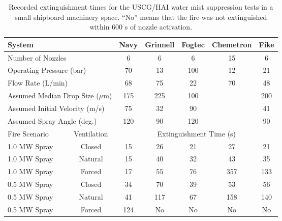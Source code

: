 \begin{table}[h!]
\caption[USCG/HAI water mist suppression extinguishment times.]{Recorded extinguishment times for the USCG/HAI water mist suppression tests in a small shipboard machinery space. ``No''
means that the fire was not extinguished within 600 s of nozzle activation.}
\begin{center}
\begin{tabular}{|l|c|c|c|c|c|c|}
\hline
\multicolumn{2}{|l|}{System}                            & Navy  & Grinnell  & Fogtec    & Chemetron & Fike   \\ \hline  \hline
\multicolumn{2}{|l|}{Number of Nozzles}                 & 6     & 6         & 6         & 15        & 6      \\ \hline
\multicolumn{2}{|l|}{Operating Pressure (bar)}          & 70    & 13        & 100       & 12        & 21     \\ \hline
\multicolumn{2}{|l|}{Flow Rate (L/min)}                 & 68    & 75        & 22        & 70        & 48     \\ \hline
\multicolumn{2}{|l|}{Assumed Median Drop Size ($\mu$m)} & 175   & 225       & 100       &           & 200    \\ \hline
\multicolumn{2}{|l|}{Assumed Initial Velocity (m/s)}    & 75    & 32        & 90        &           & 41     \\ \hline
\multicolumn{2}{|l|}{Assumed Spray Angle (deg.)}        & 120   & 90        & 120       &           & 90     \\ \hline \hline
Fire Scenario       & Ventilation                       & \multicolumn{5}{c|}{Extinguishment Time (s)}      \\ \hline \hline
1.0 MW Spray        & Closed                            & 15    & 26        & 21        & 27        & 21     \\ \hline
1.0 MW Spray        & Natural                           & 15    & 40        & 32        & 43        & 35     \\ \hline
1.0 MW Spray        & Forced                            & 17    & 55        & 76        & 357       & 133    \\ \hline
0.5 MW Spray        & Closed                            & 34    & 70        & 39        & 53        & 56     \\ \hline
0.5 MW Spray        & Natural                           & 41    & 117       & 67        & 158       & 140    \\ \hline
0.5 MW Spray        & Forced                            & 124   & No        & No        & No        & No     \\ \hline

\end{tabular}
\end{center}
\end{table}
